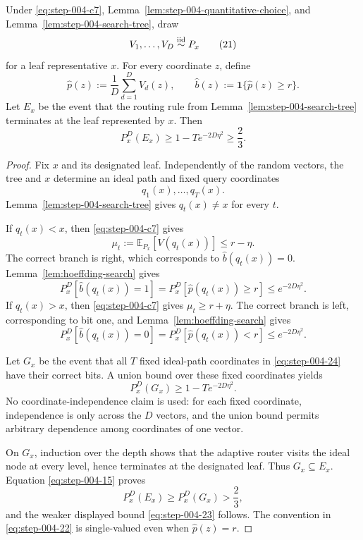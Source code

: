 \begin{proposition}
\label{prop:step-004-correct-path}

Under \eqref{eq:step-004-c7}, Lemma~\ref{lem:step-004-quantitative-choice}, and Lemma~\ref{lem:step-004-search-tree}, draw
\[
V_1,\ldots,V_D\stackrel{\rm iid}{\sim}P_x
\tag{21}\label{eq:step-004-21}
\]
for a leaf representative \(x\). For every coordinate \(z\), define
\[
\widehat p(z):=\frac1D\sum_{d=1}^D V_d(z),
\qquad
\widehat b(z):=\mathbf 1\{\widehat p(z)\ge r\}.
\tag{22}\label{eq:step-004-22}
\]
Let \(E_x\) be the event that the routing rule from Lemma~\ref{lem:step-004-search-tree} terminates at the leaf represented by \(x\). Then
\[
P_x^D(E_x)
\ge1-T e^{-2D\eta^2}
\ge\frac23.
\tag{23}\label{eq:step-004-23}
\]

\end{proposition}

\begin{proof}

Fix \(x\) and its designated leaf. Independently of the random vectors, the tree and \(x\) determine an ideal path and fixed query coordinates
\[
q_1(x),\ldots,q_T(x).
\tag{24}\label{eq:step-004-24}
\]
Lemma~\ref{lem:step-004-search-tree} gives \(q_t(x)\ne x\) for every \(t\).

If \(q_t(x)<x\), then \eqref{eq:step-004-c7} gives
\[
\mu_t:=\mathbb E_{P_x}[V(q_t(x))]\le r-\eta.
\]
The correct branch is right, which corresponds to \(\widehat b(q_t(x))=0\). Lemma~\ref{lem:hoeffding-search} gives
\[
P_x^D\!\left[\widehat b(q_t(x))=1\right]
=P_x^D\!\left[\widehat p(q_t(x))\ge r\right]
\le e^{-2D\eta^2}.
\tag{25}\label{eq:step-004-25}
\]
If \(q_t(x)>x\), then \eqref{eq:step-004-c7} gives \(\mu_t\ge r+\eta\). The correct branch is left, corresponding to bit one, and Lemma~\ref{lem:hoeffding-search} gives
\[
P_x^D\!\left[\widehat b(q_t(x))=0\right]
=P_x^D\!\left[\widehat p(q_t(x))<r\right]
\le e^{-2D\eta^2}.
\tag{26}\label{eq:step-004-26}
\]

Let \(G_x\) be the event that all \(T\) fixed ideal-path coordinates in \eqref{eq:step-004-24} have their correct bits. A union bound over these fixed coordinates yields
\[
P_x^D(G_x)\ge1-T e^{-2D\eta^2}.
\tag{27}\label{eq:step-004-27}
\]
No coordinate-independence claim is used: for each fixed coordinate, independence is only across the \(D\) vectors, and the union bound permits arbitrary dependence among coordinates of one vector.

On \(G_x\), induction over the depth shows that the adaptive router visits the ideal node at every level, hence terminates at the designated leaf. Thus \(G_x \subseteq E_x\). Equation \eqref{eq:step-004-15} proves
\[
P_x^D(E_x)\ge P_x^D(G_x)>\frac23,
\]
and the weaker displayed bound \eqref{eq:step-004-23} follows. The convention in \eqref{eq:step-004-22} is single-valued even when \(\widehat p(z)=r\).

\end{proof}


